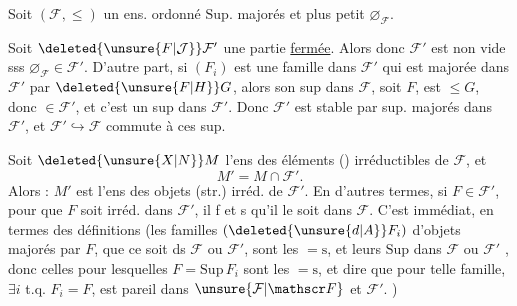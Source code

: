 
Soit $(\mathcal F,\leq)$ un ens. ordonné   $\mathrm{Sup}$. majorés et plus petit  $\varnothing_{\mathcal F}$.

Soit $\deleted{\unsure{F|\mathcal J}}\mathcal F'$ une partie \uline{fermée}. Alors donc $\mathcal F'$  est non vide sss $\varnothing_{\mathcal F}\in\mathcal F'$. D'autre part, si $(F_i)$ est une famille dans $\mathcal F'$ qui est majorée dans $\mathcal F'$ par $\deleted{\unsure{F|H}}G$, alors son sup dans $\mathcal F$, soit $F$, est $\leq G$, donc $\in\mathcal F'$, et c'est un sup dans $\mathcal F'$. Donc $\mathcal F'$ est stable par sup. majorés dans $\mathcal F'$, et $\mathcal F'\hookrightarrow\mathcal F$ commute à ces sup.

Soit $\deleted{\unsure{X|N}}M$ l'ens des éléments () irréductibles de $\mathcal F$, et
\[
M'=M\cap\mathcal F'.
\]
Alors : $M'$ est l'ens des objets (str.) irréd. de $\mathcal F'$. En d'autres termes, si $F\in\mathcal F'$, pour que $F$ soit irréd. dans $\mathcal F'$, il f et s qu'il le soit dans $\mathcal F$. C'est immédiat, en termes des définitions (les familles $(\deleted{\unsure{d|A}}F_i)$ d'objets  majorés par $F$, que ce soit ds $\mathcal F$ ou $\mathcal F'$, sont les $=\mathrm{s}$, et leurs $\mathrm{Sup}$ dans $\mathcal F$ ou $\mathcal F'$ , donc celles pour lesquelles $F=\mathrm{Sup}\,F_i$ sont les $=\mathrm{s}$, et dire que pour
telle famille, $\exists i$ t.q. $F_i=F$, est  pareil dans $\unsure{\mathcal F|\mathscr F}$ et $\mathcal F'$. )

